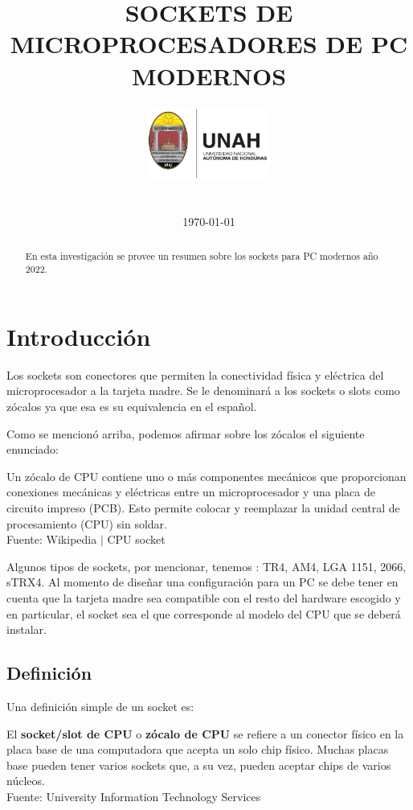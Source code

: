\documentclass[conference]{IEEEtran}
\title{SOCKETS DE MICROPROCESADORES DE PC MODERNOS}
\author{
\includegraphics[width = 40mm]{images/logo-unah.png}\\[8ex]
\IEEEauthorblockN{Tobias Briones}
\IEEEauthorblockN{tobias.briones@unah.hn}
\IEEEauthorblockA{\textit{Universidad Nacional Autónoma de Honduras} \\
\textit{Ingeniería de Sistemas} \\
\textit{I PAC 2022} \\
\textit{IS911-MICROPROCESADORES}} \\\vspace*{20pt} \normalsize  \\
\today
}
\begin{document}
\maketitle

\begin{abstract}
En esta investigación se provee un resumen sobre los sockets para PC modernos año 2022.
\end{abstract}

\tableofcontents

\section{Introducción}

Los sockets son conectores que permiten la conectividad física y eléctrica del microprocesador a la tarjeta madre. Se le denominará a los sockets o slots como zócalos ya que esa es su equivalencia en el español.

\bigbreak

Como se mencionó arriba, podemos afirmar sobre los zócalos el siguiente enunciado:

\begin{displayquote}
    Un zócalo de CPU contiene uno o más componentes mecánicos que proporcionan conexiones mecánicas y eléctricas entre un microprocesador y una placa de circuito impreso (PCB). Esto permite colocar y reemplazar la unidad central de procesamiento (CPU) sin soldar.\\
    \small Fuente: Wikipedia $\mid$ CPU socket \cite{wikipedia-contributors-2022}
\end{displayquote}

\bigbreak

Algunos tipos de sockets, por mencionar, tenemos \cite{authortechnews-2020}: TR4, AM4, LGA 1151, 2066, sTRX4. Al momento de diseñar una configuración para un PC se debe tener en cuenta que la tarjeta madre sea compatible con el resto del hardware escogido y en particular, el socket sea el que corresponde al modelo del CPU que se deberá instalar.

\subsection{Definición}

Una definición simple de un socket es:

\begin{displayquote}
    El \textbf{socket/slot de CPU} o \textbf{zócalo de CPU} se refiere a un conector físico en la placa base de una computadora que acepta un solo chip físico. Muchas placas base pueden tener varios sockets que, a su vez, pueden aceptar chips de varios núcleos.\\
    \small Fuente: University Information Technology Services \cite{university-information-technology-services-2019}
\end{displayquote}
\end{document}
